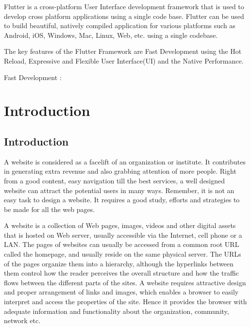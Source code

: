 \documentclass[11pt,a4paper,oneside,openright]{report}
\begin{document}
{{ \hspace{0.2in}Flutter is a cross-platform User Interface development framework that is used to develop cross platform applications using a single code base. Flutter can be used to build beautiful, natively compiled application for various platforms such as Android, iOS, Windows, Mac, Linux, Web, etc. using a single codebase. 

 \hspace{0.2in}The key features of the Flutter Framework are Fast Development using the Hot Reload, Expressive and Flexible User Interface(UI) and the Native Performance.

\hspace{0.2in}Fast Development : 



\newpage
{} %
\tableofcontents
\newpage

\listoffigures





\chapter{Introduction}
\label{chap:intro}

\section{Introduction}
\hspace{0.2in} A website is considered as a facelift of an organization or institute. It contributes in generating extra revenue and also grabbing attention of more people. Right from a good content, easy navigation till the best services, a well designed website can attract the potential users in many ways. Remember, it is not an easy task to design a website. It requires a good study, efforts and strategies to be made for all the web pages.
\par{A website is a collection of Web pages, images, videos and other digital assets that is hosted on Web server, usually accessible via the Internet, cell phone or a LAN.
The pages of websites can usually be accessed from a common root URL called the homepage, and usually reside on the same physical server. The URLs of the pages organize them into a hierarchy, although the hyperlinks between them control how the reader perceives the overall structure and how the traffic flows between the different parts of the sites.
A website requires attractive design and proper arrangement of links and images, which enables a browser to easily interpret and access the properties of the site. Hence it provides the browser with adequate information and functionality about the organization, community, network etc.}

}}
\end{document}
